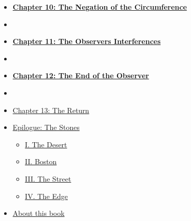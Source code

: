 \documentclass[
  ngerman,
]{article}
\providecommand{\tightlist}{%
  \setlength{\itemsep}{0pt}\setlength{\parskip}{0pt}}
\begin{document}
\begin{itemize}
{{  9: The Blank Page}}
\item
  \protect{}\label{toc-chapter-10-the-negation-of-the-circumference}\hyperref[chapter-10-the-negation-of-the-circumference]{\textbf{Chapter
  10: The Negation of the Circumference}}
\item
  \protect{}\label{toc-section-4}\hyperref[section-4]{\hfill\break
  }
\item
  \protect{}\label{toc-chapter-11-the-observers-interferences}\hyperref[chapter-11-the-observers-interferences]{\textbf{Chapter
  11: The Observer\textquotesingle s Interferences}}
\item
  \protect{}\label{toc-section-5}\hyperref[section-5]{\hfill\break
  }
\item
  \protect{}\label{toc-chapter-12-the-end-of-the-observer}\hyperref[chapter-12-the-end-of-the-observer]{\textbf{Chapter
  12: The End of the Observer}}
\item
  \protect{}\label{toc-section-6}\hyperref[section-6]{\hfill\break
  }
\item
  \protect{}\label{toc-chapter-13-the-return}\hyperref[chapter-13-the-return]{Chapter
  13: The Return}
\item
  \protect{}\label{toc-epilogue-the-stones}\hyperref[epilogue-the-stones]{Epilogue:
  The Stones}

  \begin{itemize}
  \tightlist
  \item
    \protect{}\label{toc-i.-the-desert}\hyperref[i.-the-desert]{I.
    The Desert}
  \item
    \protect{}\label{toc-ii.-boston}\hyperref[ii.-boston]{II.
    Boston}
  \item
    \protect{}\label{toc-iii.-the-street}\hyperref[iii.-the-street]{III.
    The Street}
  \item
    \protect{}\label{toc-iv.-the-edge}\hyperref[iv.-the-edge]{IV.
    The Edge}
  \end{itemize}
\item
  \protect{}\label{toc-about-this-book}\hyperref[about-this-book]{About
  this book}


\end{itemize}
\end{document}
